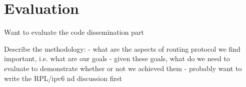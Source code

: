 \section{Evaluation} \label{section:evaluation}

Want to evaluate the code dissemination part

Describe the methodology:
- what are the aspects of routing protocol we find important, i.e. what are our goals
- given these goals, what do we need to evaluate to demonstrate whether or not we achieved them
- probably want to write the RPL/ipv6 nd discussion first
\fi
